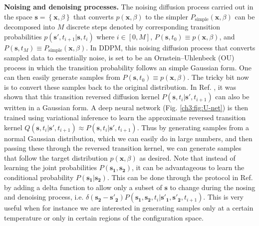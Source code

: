 \textbf{Noising and denoising processes.} The noising diffusion process carried out in the space $\mathbf{s}=\left\{\mathbf{x},\beta\right \}$ that converts $p(\mathbf{x},\beta)$ to the simpler $P_{\text{simple}}(\mathbf{x},\beta)$ can be decomposed into $M$ discrete steps denoted by corresponding transition probabilities $p( \mathbf{s'}, t_{i+1}| \mathbf{s}, t_i)$ where $i\in[0,M]$, $P(\mathbf{s},t_0) \equiv p(\mathbf{x},\beta) $, and $P(\mathbf{s},t_M) \equiv P_{\text{simple}}(\mathbf{x},\beta)$. In DDPM, this noising diffusion process that converts sampled data to essentially noise, is set to be an Ornstein--Uhlenbeck (OU) process in which the transition probability follows an simple Gaussian form. One can then easily generate samples from $P(\mathbf{s},t_0) \equiv p(\mathbf{x},\beta) $. The tricky bit now is to convert these samples back to the original distribution. In Ref. , it was shown that this transition reversed diffusion kernel $P( \mathbf{s}, t_{i}| \mathbf{s'}, t_{i+1})$ can also be written in a Gaussian form. A deep neural network (Fig. \ref{ch3:fig:U-net}) is then trained using variational inference to learn the approximate reversed transition kernel $Q( \mathbf{s}, t_{i}| \mathbf{s'}, t_{i+1}) \approx P( \mathbf{s}, t_{i}| \mathbf{s'}, t_{i+1}) $. Thus by generating samples from a normal Gaussian distribution, which we can easily do in large numbers, and then passing these through the reversed transition kernel, we can generate samples that follow the target distribution $p(\mathbf{x},\beta)$ as desired. Note that instead of learning the joint probabilities $P(\mathbf{s_1},\mathbf{s_2})$, it can be advantageous to learn the conditional probability $P(\mathbf{s_1}|\mathbf{s_2})$. This can be done through the protocol in Ref.  by adding a delta function to allow only a subset of $\mathbf{s}$ to change during the nosing and denoising process, i.e. $\delta(\mathbf{s_2} - \mathbf{s'_2})P( \mathbf{s_1}, \mathbf{s_2}, t_{i}| \mathbf{s'_1}, \mathbf{s'_2},  t_{i+1}) $. This is very useful when for instance we are interested in generating samples only at a certain temperature or only in certain regions of the configuration space.
